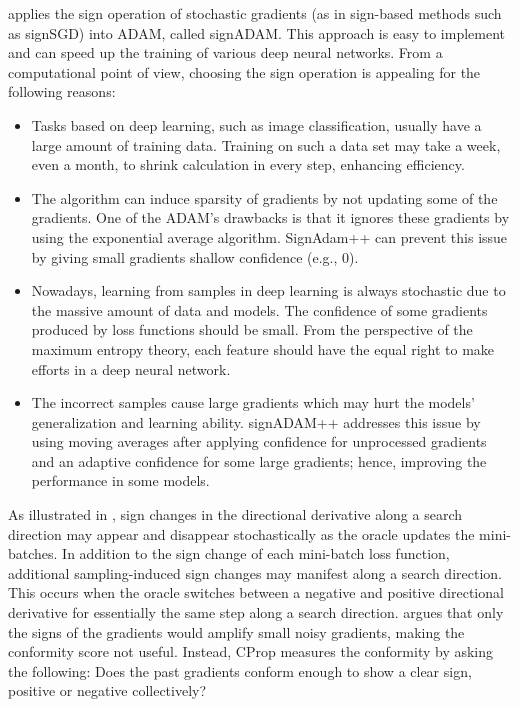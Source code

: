 \documentclass[11pt]{book}
\begin{document}
\cite{wang2019signadam++} applies the sign operation of stochastic
gradients (as in sign-based methods such as signSGD) into ADAM, called
signADAM. This approach is easy to implement and can speed up the
training of various deep neural networks. From a computational point
of view, choosing the sign operation is appealing for the following
reasons:
\begin{itemize}
\item Tasks based on deep learning, such as image classification, usually
have a large amount of training data. \textquotedbl Training\textquotedbl{}
on such a data set may take a week, even a month, to shrink calculation
in every step, enhancing efficiency.
\item The algorithm can induce sparsity of gradients by not updating some
of the gradients. One of the ADAM's drawbacks is that it ignores these
gradients by using the exponential average algorithm. SignAdam++ can
prevent this issue by giving small gradients shallow confidence (e.g.,
$0$).
\item Nowadays, learning from samples in deep learning is always stochastic
due to the massive amount of data and models. The confidence of some
gradients produced by loss functions should be small. From the perspective
of the maximum entropy theory, each feature should have the equal
right to make efforts in a deep neural network.
\item The incorrect samples cause large gradients which may hurt the models'
generalization and learning ability. signADAM++ addresses this issue
by using moving averages after applying confidence for unprocessed
gradients and an adaptive confidence for some large gradients; hence,
improving the performance in some models.
\end{itemize}
\noindent As illustrated in \cite{kafka2019traversing}, sign changes
in the directional derivative along a search direction may appear
and disappear stochastically as the oracle updates the mini-batches.
In addition to the sign change of each mini-batch loss function, additional
sampling-induced sign changes may manifest along a search direction.
This occurs when the oracle switches between a negative and positive
directional derivative for essentially the same step along a search
direction. \cite{preechakul2019cprop} argues that only the signs
of the gradients would amplify small noisy gradients, making the conformity
score not useful. Instead, CProp measures the conformity by asking
the following:\textquotedbl{} Does the past gradients conform enough
to show a clear sign, positive or negative collectively?\textquotedbl{} 
\end{document}
